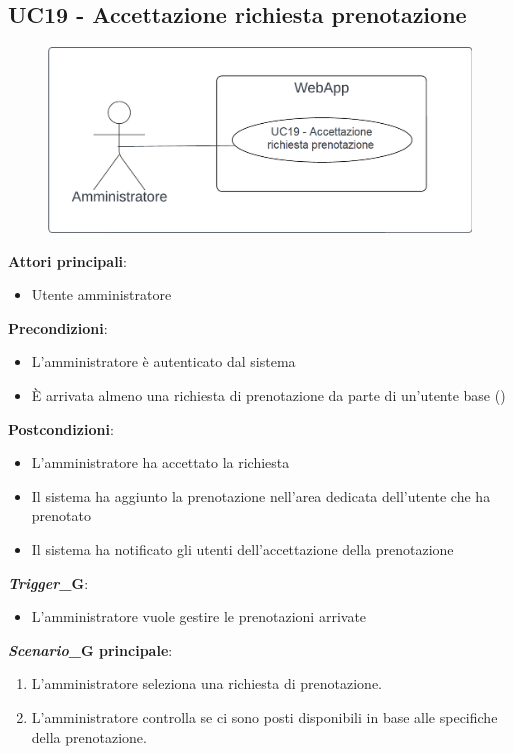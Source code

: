 \subsection{UC19 - Accettazione richiesta prenotazione}\label{usecase:19}
\begin{figure}[H]
    \centering
    \includegraphics[width=0.9\linewidth]{ucd/ucd19.png}
\end{figure}
\textbf{Attori principali}:
\begin{itemize}
    \item Utente amministratore
\end{itemize}
\textbf{Precondizioni}:
\begin{itemize}
    \item L'amministratore è autenticato dal sistema
    \item \`E arrivata almeno una richiesta di prenotazione da parte di un'utente base ()
\end{itemize}
\textbf{Postcondizioni}:
\begin{itemize}
    \item L'amministratore ha accettato la richiesta
    \item Il sistema ha aggiunto la prenotazione nell'area dedicata dell'utente che ha prenotato
    \item Il sistema ha notificato gli utenti dell'accettazione della prenotazione
\end{itemize}
\textbf{\textit{Trigger}_G}:
\begin{itemize}
    \item L'amministratore vuole gestire le prenotazioni arrivate
\end{itemize}
\textbf{\textit{Scenario}_G principale}:
\begin{enumerate}
    \item L'amministratore seleziona una richiesta di prenotazione.
    \item L'amministratore controlla se ci sono posti disponibili in base alle specifiche della prenotazione.
\end{enumerate}

